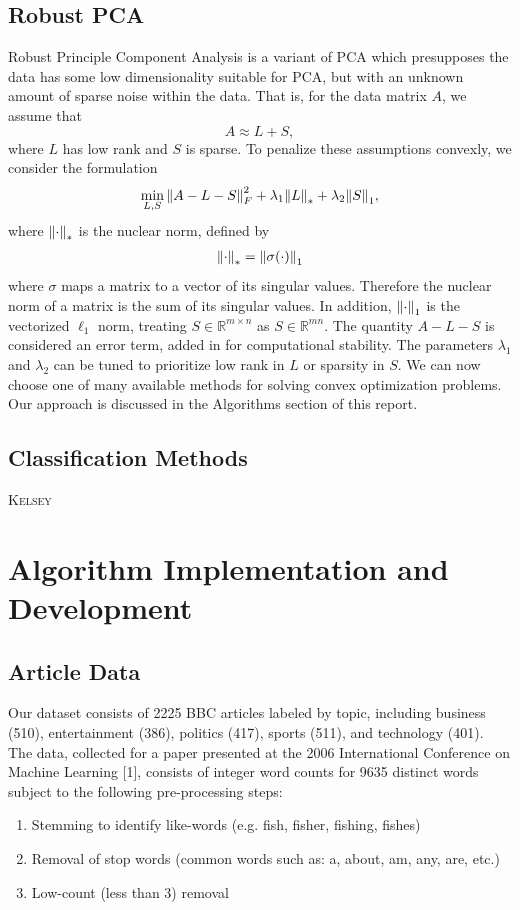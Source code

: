 \documentclass[12pt]{article}
\newcommand{\R}{\mathbb{R}}
\newcommand{\comment}[1]{\textsc{\color[rgb]{1,0,0}#1}}
\begin{document}
\subsection{Robust PCA}
Robust Principle Component Analysis is a variant of PCA which presupposes the data has some low dimensionality suitable for PCA, but with an unknown amount of sparse noise within the data. That is, for the data matrix $A$, we assume that 
$$  A \approx L + S,$$
where $L$ has low rank and $S$ is sparse. To penalize these assumptions convexly, we consider the formulation
\begin{align}
\min_{L,S} \norm{A-L-S}_{F}^2 + \lambda_1 \norm{L}_* + \lambda_2 \norm{S}_1,
\label{eq:robust_obj}
\end{align}
where $\norm{\cdot}_*$ is the nuclear norm, defined by
\begin{align*}
\norm{\cdot}_* = \norm{\sigma(\cdot)}_1
\end{align*}
where $\sigma$ maps a matrix to a vector of its singular values. Therefore the nuclear norm of a matrix is the sum of its singular values. In addition, $\norm{\cdot}_1$ is the vectorized $\ell_1$ norm, treating $S \in \R^{m \times n}$ as $S \in \R^{mn}.$ The quantity $A - L - S$ is considered an error term, added in for computational stability. The parameters $\lambda_1$ and $\lambda_2$ can be tuned to prioritize low rank in $L$ or sparsity in $S.$ We can now choose one of many available methods for solving convex optimization problems. Our approach is discussed in the Algorithms section of this report. 


\subsection{Classification Methods}
\comment{Kelsey}
\section{Algorithm Implementation and Development}

\subsection{Article Data}

Our dataset consists of 2225 BBC articles labeled by topic, including business (510), entertainment (386), politics (417), sports (511), and technology (401). The data, collected for a paper presented at the 2006 International Conference on Machine Learning [1], consists of integer word counts for 9635 distinct words subject to the following pre-processing steps:
\begin{enumerate}
\item Stemming to identify like-words (e.g. fish, fisher, fishing, fishes)
\item Removal of stop words (common words such as: a, about, am, any, are, etc.)
\item Low-count (less than 3) removal
\end{enumerate}
\end{document}
